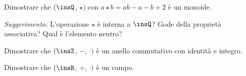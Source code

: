 \begin{esercizio}
\label{ese:E.18}
Dimostrare che $(\insQ$, $\star)$ con $a \star b=ab−a−b+2$ è un monoide.

\emph{Suggerimento:} L'operazione $\star$ è interna a $\insQ$? Gode della proprietà associativa? Qual è l'elemento neutro?
\end{esercizio}

\begin{esercizio}
\label{ese:E.19}
Dimostrare che $(\insZ$, $-$, $\cdot)$ è un anello commutativo con
identità e integro.
\end{esercizio}

\begin{esercizio}
\label{ese:E.20}
Dimostrare che $(\insR$, $+$, $\cdot)$ è un campo.
\end{esercizio}

